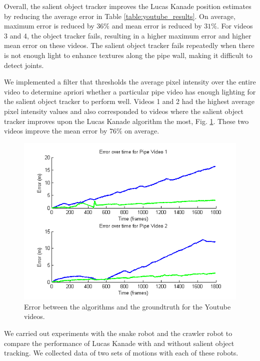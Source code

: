 \documentclass[letterpaper, 10 pt, conference]{ieeeconf}
\newcommand{\comment}[1]{} %
\begin{document}
Overall, the salient object tracker improves the Lucas Kanade position estimates by reducing the average error in Table \ref{table:youtube_results}. On average, maximum error is reduced by $36 \%$ and mean error is reduced by $31 \%$. For videos 3 and 4, the object tracker fails, resulting in a higher maximum error and higher mean error on these videos. The salient object tracker fails repeatedly when there is not enough light to enhance textures along the pipe wall, making it difficult to detect joints.

We implemented a filter that thresholds the average pixel intensity over the entire video to determine apriori whether a particular pipe video has enough lighting for the salient object tracker to perform well. Videos 1 and 2 had the highest average pixel intensity values and also corresponded to videos where the salient object tracker improves upon the Lucas Kanade algorithm the most, Fig. \ref{youtube:error_over_time}. These two videos improve the mean error by $76 \%$ on average.

\comment{Since we can control the lighting of a robot, we need only make sure that this condition is met before conducting experiments.} 

\begin{figure}[tb]
	\centering
	\includegraphics[width=\columnwidth]{youtube_err_v_time.png}
	\caption{Error between the algorithms and the groundtruth for the Youtube videos.}
    \label{youtube:error_over_time}
\end{figure}


We carried out experiments with the snake robot and the crawler robot to compare the performance of Lucas Kanade with and without salient object tracking. We collected data of two sets of motions with each of these robots.
\end{document}
